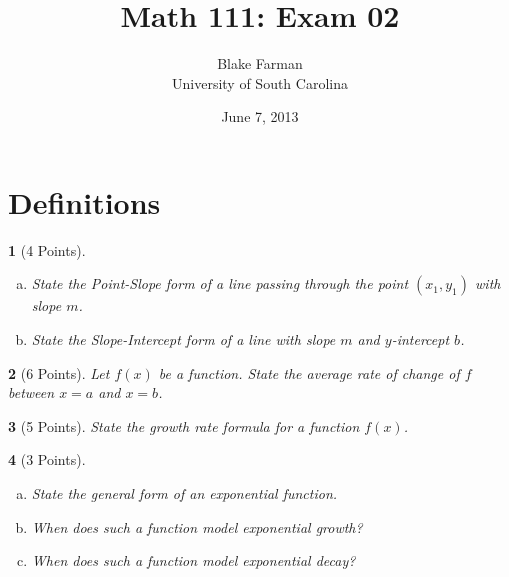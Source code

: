 \documentclass[12pt]{amsart}
\author{Blake Farman\\University of South Carolina}
\title{Math 111: Exam 02}
\date{June 7, 2013}
\begin{document}
\maketitle

\begin{center}
\end{center}

\vspace{0.2in}
\vspace{0.2in}

\theoremstyle{plain}
\newtheorem{thm}{}
\newtheorem{lem}{Lemma}
\theoremstyle{definition}
\newtheorem{defn}{Definition}

\section{Definitions}
\begin{thm}[4 Points]\label{ex1}
  \begin{enumerate}[(a)]
  \item
    State the Point-Slope form of a line passing through the point $(x_1, y_1)$ with slope $m$.
    \vspace{1in}
  \item
    State the Slope-Intercept form of a line with slope $m$ and $y$-intercept $b$.
    \vspace{1in}
  \end{enumerate}
\end{thm}

\begin{thm}[6 Points]\label{ex2}
  Let $f(x)$ be a function.
  State the average rate of change of $f$ between $x = a$ and $x = b$.
\end{thm}

\newpage

\begin{thm}[5 Points]\label{ex3}
  State the growth rate formula for a function $f(x)$.
  \vspace{1in}
\end{thm}

\begin{thm}[3 Points]\label{ex4}
  \begin{enumerate}[(a)]
  \item
    State the general form of an exponential function.
    \vspace{1in}
    \item
      When does such a function model exponential growth?
      \vspace{1in}
    \item
      When does such a function model exponential decay?
      \vspace{1in}
  \end{enumerate}
\end{thm}
\end{document}
